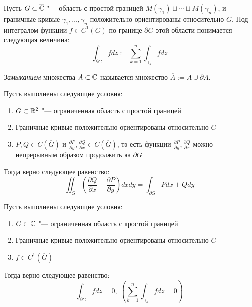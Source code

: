 \begin{note}
    Пусть $G \subset \overline{\mathbb{C}}$ "--- область с простой границей $M(\gamma_1) \sqcup \dotsb \sqcup M(\gamma_n)$, и граничные кривые $\gamma_1, \dotsc, \gamma_n$ положительно ориентированы относительно $G$. Под интегралом функции $f \in C^1(G)$ по границе $\partial G$ этой области понимается следующая величина:
    \[\int_{\partial G}fdz := \sum_{k = 1}^n\int_{\gamma_k}fdz\]
\end{note}

\begin{definition}
	\textit{Замыканием} множества $A \subset \mathbb{C}$ называется множество $\overline{A} := A \cup \partial A$.
\end{definition}

\begin{theorem}
	Пусть выполнены следующие условия:
	\begin{enumerate}
		\item $G \subset \mathbb{R}^2$ "--- ограниченная область с простой границей
		
		\item Граничные кривые положительно ориентированы относительно $G$
		
		\item $P, Q \in C(\overline{G})$ и $\frac{\partial P}{\partial y}, \frac{\partial Q}{\partial x} \in C(\overline{G})$, то есть функции $\frac{\partial P}{\partial y}, \frac{\partial Q}{\partial x}$ можно непрерывным образом продолжить на $\partial G$
	\end{enumerate}
	
	Тогда верно следующее равенство:
	\[\iint_G\left(\frac{\partial Q}{\partial x} - \frac{\partial P}{\partial y}\right)dxdy = \int_{\partial G} Pdx + Qdy\]
\end{theorem}

\begin{theorem}
	Пусть выполнены следующие условия:
	\begin{enumerate}
		\item $G \subset \mathbb{C}$ "--- ограниченная область с простой границей
		
		\item Граничные кривые положительно ориентированы относительно $G$
		
		\item $f \in C^1(\overline{G})$
	\end{enumerate}

	Тогда верно следующее равенство:
	\[\int_{\partial G} fdz = 0,\; \left(\sum_{k = 1}^n\int_{\gamma_k}fdz = 0\right)\]
\end{theorem}

